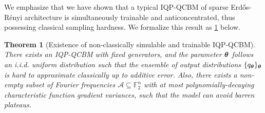 \documentclass{article}
\theoremstyle{plain}
\newtheorem{theorem}{Theorem}[section]
\theoremstyle{definition}
\theoremstyle{remark}
\begin{document}
We emphasize that we have shown that a typical IQP-QCBM of sparse Erd\H os-R\'enyi architecture is simultaneously trainable and anticoncentrated, thus possessing classical sampling hardness. We formalize this result as \cref{thm:ac_and_pst_exist} below.
\begin{theorem}[Existence of non-classically simulable and trainable IQP-QCBM]
\label{thm:ac_and_pst_exist}
There exists an IQP-QCBM with fixed generators, and the parameter ${\bm{\theta}}$ follows an i.i.d. uniform distribution such that the ensemble of output distributions $\{q_{\bm{\theta}}\}_{\bm{\theta}}$ is hard to approximate classically up to additive error. Also, there exists a non-empty subset of Fourier frequencies $\mathcal{A} \subseteq \mathbb{F}_2^n$ with at most polynomially-decaying characteristic function gradient variances, such that the model can avoid barren plateaus.
\end{theorem}
\end{document}
